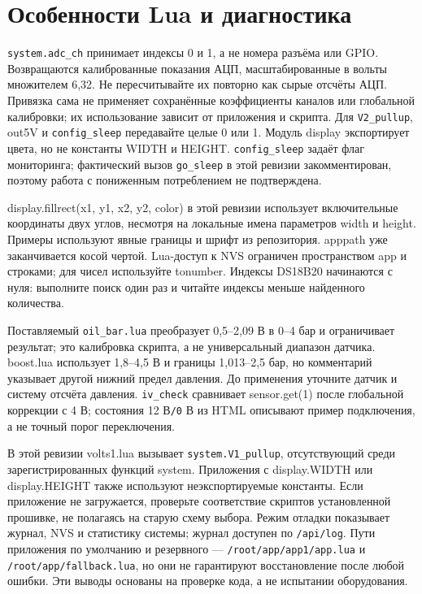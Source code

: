 \section{Особенности Lua и диагностика}
\nolinkurl{system.adc_ch} принимает индексы 0 и 1, а не номера разъёма или GPIO. Возвращаются калиброванные показания АЦП, масштабированные в вольты множителем 6,32. Не пересчитывайте их повторно как сырые отсчёты АЦП. Привязка сама не применяет сохранённые коэффициенты каналов или глобальной калибровки; их использование зависит от приложения и скрипта. Для \nolinkurl{V2_pullup}, out5V и \nolinkurl{config_sleep} передавайте целые 0 или 1. Модуль display экспортирует цвета, но не константы WIDTH и HEIGHT. \nolinkurl{config_sleep} задаёт флаг мониторинга; фактический вызов \nolinkurl{go_sleep} в этой ревизии закомментирован, поэтому работа с пониженным потреблением не подтверждена.

display.fillrect(x1, y1, x2, y2, color) в этой ревизии использует включительные координаты двух углов, несмотря на локальные имена параметров width и height. Примеры используют явные границы и шрифт из репозитория. apppath уже заканчивается косой чертой. Lua-доступ к NVS ограничен пространством app и строками; для чисел используйте tonumber. Индексы DS18B20 начинаются с нуля: выполните поиск один раз и читайте индексы меньше найденного количества.

Поставляемый \nolinkurl{oil_bar.lua} преобразует 0,5–2,09 В в 0–4 бар и ограничивает результат; это калибровка скрипта, а не универсальный диапазон датчика. boost.lua использует 1,8–4,5 В и границы 1,013–2,5 бар, но комментарий указывает другой нижний предел давления. До применения уточните датчик и систему отсчёта давления. \nolinkurl{iv_check} сравнивает sensor.get(1) после глобальной коррекции с 4 В; состояния 12 В\nolinkurl{/0} В из HTML описывают пример подключения, а не точный порог переключения.

В этой ревизии volts1.lua вызывает \nolinkurl{system.V1_pullup}, отсутствующий среди зарегистрированных функций system. Приложения с display.WIDTH или display.HEIGHT также используют неэкспортируемые константы. Если приложение не загружается, проверьте соответствие скриптов установленной прошивке, не полагаясь на старую схему выбора. Режим отладки показывает журнал, NVS и статистику системы; журнал доступен по \nolinkurl{/api/log}. Пути приложения по умолчанию и резервного — \nolinkurl{/root/app/app1/app.lua} и \nolinkurl{/root/app/fallback.lua}, но они не гарантируют восстановление после любой ошибки. Эти выводы основаны на проверке кода, а не испытании оборудования.

